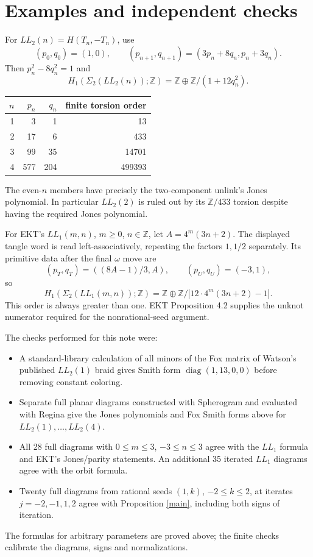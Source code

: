 \documentclass[11pt]{article}
\newcommand{\Z}{\mathbb Z}
\newcommand{\Sig}{\Sigma_2}
\begin{document}
\section{Examples and independent checks}
For $LL_2(n)=H(T_n,-T_n)$, use
\[
(p_0,q_0)=(1,0),\qquad
(p_{n+1},q_{n+1})=(3p_n+8q_n,p_n+3q_n).
\]
Then $p_n^2-8q_n^2=1$ and
\[
H_1(\Sig(LL_2(n));\Z)=\Z\oplus\Z/(1+12q_n^2).
\]
\begin{center}
\begin{tabular}{rrrr}
\toprule
$n$&$p_n$&$q_n$&finite torsion order\\\midrule
1&3&1&13\\2&17&6&433\\3&99&35&14701\\4&577&204&499393\\\bottomrule
\end{tabular}
\end{center}
The even-$n$ members have precisely the two-component unlink's Jones polynomial. In particular $LL_2(2)$ is ruled out by its $\Z/433$ torsion despite having the required Jones polynomial.

For EKT's $LL_1(m,n)$, $m\ge0$, $n\in\Z$, let $A=4^m(3n+2)$. The displayed tangle word is read left-associatively, repeating the factors $1,1/2$ separately. Its primitive data after the final $\omega$ move are
\[
(p_T,q_T)=((8A-1)/3,A),\qquad (p_U,q_U)=(-3,1),
\]
so
\[
H_1(\Sig(LL_1(m,n));\Z)=\Z\oplus\Z/|12\cdot4^m(3n+2)-1|.
\]
This order is always greater than one. EKT Proposition 4.2 supplies the unknot numerator required for the nonrational-seed argument.

The checks performed for this note were:
\begin{itemize}
\item A standard-library calculation of all minors of the Fox matrix of Watson's published $LL_2(1)$ braid gives Smith form $\operatorname{diag}(1,13,0,0)$ before removing constant coloring.
\item Separate full planar diagrams constructed with Spherogram and evaluated with Regina give the Jones polynomials and Fox Smith forms above for $LL_2(1),\ldots,LL_2(4)$.
\item All 28 full diagrams with $0\le m\le3$, $-3\le n\le3$ agree with the $LL_1$ formula and EKT's Jones/parity statements. An additional 35 iterated $LL_1$ diagrams agree with the orbit formula.
\item Twenty full diagrams from rational seeds $(1,k)$, $-2\le k\le2$, at iterates $j=-2,-1,1,2$ agree with Proposition \ref{main}, including both signs of iteration.
\end{itemize}
The formulas for arbitrary parameters are proved above; the finite checks calibrate the diagrams, signs and normalizations.
\end{document}
